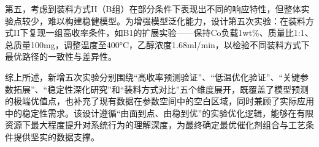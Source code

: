 第五，考虑到装料方式II（B组）在部分条件下表现出不同的响应特性，但整体实验点较少，难以构建稳健模型。为增强模型泛化能力，设计第五次实验：在装料方式II下复现一组高收率条件，如B1的扩展实验——保持Co负载1wt\%、质量比1:1、总质量100mg，调整温度至400°C，乙醇浓度1.68ml/min，以检验不同装料方式下最优路径的一致性与差异性。

综上所述，新增五次实验分别围绕“高收率预测验证”、“低温优化验证”、“关键参数拓展”、“稳定性深化研究”和“装料方式对比”五个维度展开，既覆盖了模型预测的极端优值点，也补充了现有数据在参数空间中的空白区域，同时兼顾了实际应用中的稳定性需求。该设计遵循“由面到点、由稳到优”的实验优化逻辑，能够在有限资源下最大程度提升对系统行为的理解深度，为最终确定最优催化剂组合与工艺条件提供坚实的数据支撑。